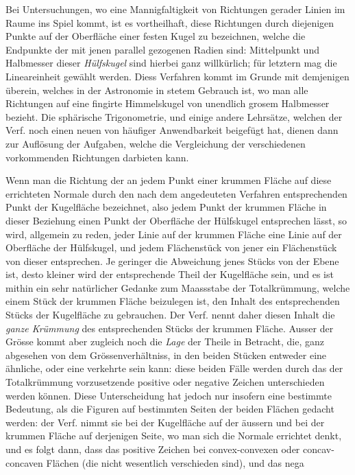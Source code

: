 %
\par\indent Bei Untersuchungen, wo eine Mannigfaltigkeit von Richtungen gerader Linien im Raume ins Spiel kommt, ist es vortheilhaft, diese Richtungen durch diejenigen Punkte auf der Oberfläche einer festen Kugel zu bezeichnen, welche die Endpunkte der mit jenen parallel gezogenen Radien sind: Mittelpunkt und Halbmesser dieser \textit{Hülfskugel} sind hierbei ganz willkürlich; für letztern mag die Lineareinheit gewählt werden. Diess Verfahren kommt im Grunde mit demjenigen überein, welches in der Astronomie in stetem Gebrauch ist, wo man alle Richtungen auf eine fingirte Himmelskugel von unendlich grosem Halbmesser bezieht. Die sphärische Trigonometrie, und einige andere Lehrsätze, welchen der Verf. noch einen neuen von häufiger Anwendbarkeit beigefügt hat, dienen dann zur Auflösung der Aufgaben, welche die Vergleichung der verschiedenen vorkommenden Richtungen darbieten kann.

Wenn man die Richtung der an jedem Punkt einer krummen Fläche auf diese errichteten Normale durch den nach dem angedeuteten Verfahren entsprechenden Punkt der Kugelfläche bezeichnet, also jedem Punkt der krummen Fläche in dieser Beziehung einen Punkt der Oberfläche der Hülfskugel entsprechen lässt, so wird, allgemein zu reden, jeder Linie auf der krummen Fläche eine Linie auf der Oberfläche der Hülfskugel, und jedem Flächenstück von jener ein Flächenstück von dieser entsprechen. Je geringer die Abweichung jenes Stücks von der Ebene ist, desto kleiner wird der entsprechende Theil der Kugelfläche sein, und es ist mithin ein sehr natürlicher Gedanke zum Maassstabe der Totalkrümmung, welche einem Stück der krummen Fläche beizulegen ist, den Inhalt des entsprechenden Stücks der Kugelfläche zu gebrauchen. Der Verf. nennt daher diesen Inhalt die \textit{ganze Krümmung} des entsprechenden Stücks der krummen Fläche. Ausser der Grösse kommt aber zugleich noch die \textit{Lage} der Theile in Betracht, die, ganz abgesehen von dem Grössenverhältniss, in den beiden Stücken entweder eine ähnliche, oder eine verkehrte sein kann: diese beiden Fälle werden durch das der Totalkrümmung vorzusetzende positive oder negative Zeichen unterschieden werden können. Diese Unterscheidung hat jedoch nur insofern eine bestimmte Bedeutung, als die Figuren auf bestimmten Seiten der beiden Flächen gedacht werden: der Verf. nimmt sie bei der Kugelfläche auf der äussern und bei der krummen Fläche auf derjenigen Seite, wo man sich die Normale errichtet denkt, und es folgt dann, dass das positive Zeichen bei convex-convexen oder concav-concaven Flächen (die nicht wesentlich verschieden sind), und das nega%
